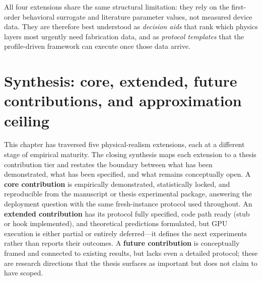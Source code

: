All four extensions share the same structural limitation: they rely on the first-order behavioral surrogate and literature parameter values, not measured device data.  They are therefore best understood as \emph{decision aids} that rank which physics layers most urgently need fabrication data, and as \emph{protocol templates} that the profile-driven framework can execute once those data arrive.


\section{Synthesis: core, extended, future contributions, and approximation ceiling}
\label{sec:pr-synthesis}

This chapter has traversed five physical-realism extensions, each at a different stage of empirical maturity.  The closing synthesis maps each extension to a thesis contribution tier and restates the boundary between what has been demonstrated, what has been specified, and what remains conceptually open.  A \textbf{core contribution} is empirically demonstrated, statistically locked, and reproducible from the manuscript or thesis experimental package, answering the deployment question with the same fresh-instance protocol used throughout.  An \textbf{extended contribution} has its protocol fully specified, code path ready (stub or hook implemented), and theoretical predictions formulated, but GPU execution is either partial or entirely deferred---it defines the next experiments rather than reports their outcomes.  A \textbf{future contribution} is conceptually framed and connected to existing results, but lacks even a detailed protocol; these are research directions that the thesis surfaces as important but does not claim to have scoped.

